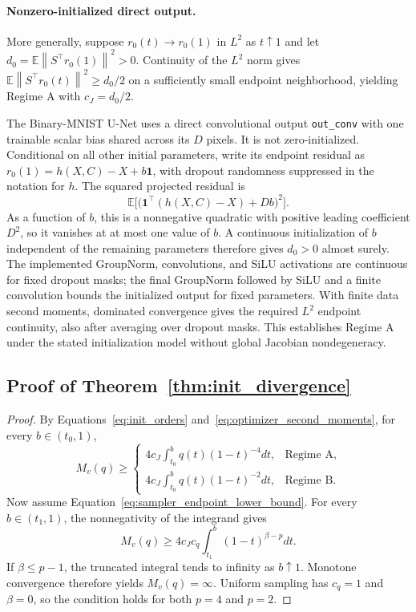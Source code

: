 \documentclass{article}
\theoremstyle{plain}
\theoremstyle{definition}
\theoremstyle{remark}
\newcommand{\Ex}{\mathbb{E}}
\newcommand{\norm}[1]{\left\lVert #1\right\rVert}
\begin{document}
\paragraph{Nonzero-initialized direct output.}
More generally, suppose $r_0(t)\to r_0(1)$ in $L^2$ as $t\uparrow1$ and let $d_0=\Ex\norm{S^\top r_0(1)}^2>0$. Continuity of the $L^2$ norm gives $\Ex\norm{S^\top r_0(t)}^2\ge d_0/2$ on a sufficiently small endpoint neighborhood, yielding Regime A with $c_J=d_0/2$.

The Binary-MNIST U-Net uses a direct convolutional output \texttt{out\_conv} with one trainable scalar bias shared across its $D$ pixels. It is not zero-initialized. Conditional on all other initial parameters, write its endpoint residual as $r_0(1)=h(X,C)-X+b\mathbf 1$, with dropout randomness suppressed in the notation for $h$. The squared projected residual is
\begin{equation}
\Ex\big[\big(\mathbf 1^\top(h(X,C)-X)+Db\big)^2\big].
\end{equation}
As a function of $b$, this is a nonnegative quadratic with positive leading coefficient $D^2$, so it vanishes at at most one value of $b$. A continuous initialization of $b$ independent of the remaining parameters therefore gives $d_0>0$ almost surely. The implemented GroupNorm, convolutions, and SiLU activations are continuous for fixed dropout masks; the final GroupNorm followed by SiLU and a finite convolution bounds the initialized output for fixed parameters. With finite data second moments, dominated convergence gives the required $L^2$ endpoint continuity, also after averaging over dropout masks. This establishes Regime A under the stated initialization model without global Jacobian nondegeneracy.

\subsection{Proof of Theorem~\ref{thm:init_divergence}}
\label{app:proof_divergence}

\begin{proof}
By Equations~\eqref{eq:init_orders} and~\eqref{eq:optimizer_second_moments}, for every $b\in(t_0,1)$,
\begin{equation}
M_v(q)
\ge
\begin{cases}
4c_J\int_{t_0}^{b}q(t)(1-t)^{-4}dt, & \text{Regime A},\\
4c_J\int_{t_0}^{b}q(t)(1-t)^{-2}dt, & \text{Regime B}.
\end{cases}
\end{equation}
Now assume Equation~\eqref{eq:sampler_endpoint_lower_bound}. For every $b\in(t_1,1)$, the nonnegativity of the integrand gives
\begin{equation}
M_v(q)
\ge4c_Jc_q\int_{t_1}^{b}(1-t)^{\beta-p}dt.
\end{equation}
If $\beta\le p-1$, the truncated integral tends to infinity as $b\uparrow1$. Monotone convergence therefore yields $M_v(q)=\infty$. Uniform sampling has $c_q=1$ and $\beta=0$, so the condition holds for both $p=4$ and $p=2$.
\end{proof}
\end{document}
